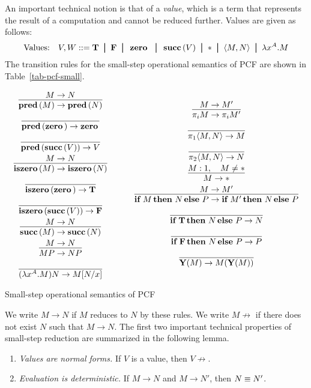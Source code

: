 \documentclass{article}
\begin{document}
An important technical notion is that of a {\em value}, which is a
term that represents the result of a computation and cannot be reduced
further. Values are given as follows:
\[ \mbox{Values:}\ssep V,W \bnf \truet \bor \falset \bor \zerot \bor
   \succt(V) \bor \unit \bor \pair{M,N} \bor \lamabs{x}{A}.M
\]
The transition rules for the small-step operational semantics of PCF
are shown in Table~\ref{tab-pcf-small}.
\begin{table*}[t]\def\nl{\\[1.8ex]}
\[
\begin{array}{c}
  \deriv{M\to N}{\predt(M)\to\predt(N)} \nl
  \deriv{}{\predt(\zerot)\to\zerot} \nl
  \deriv{}{\predt(\succt(V))\to V} \nl
  \deriv{M\to N}{\iszerot(M)\to\iszerot(N)} \nl
  \deriv{}{\iszerot(\zerot)\to\truet} \nl
  \deriv{}{\iszerot(\succt(V))\to\falset} \nl
  \deriv{M\to N}{\succt(M)\to\succt(N)} \nl
  \deriv{M\to N}{MP\to NP} \nl
  \deriv{}{(\lamabs{x}{A}.M)N\to \subst{M}{N}{x}}
\end{array}
\sep
\begin{array}{c}
  \deriv{M\to M'}{\proj{i} M\to \proj{i}M'} \nl
  \deriv{}{\proj1\pair{M,N}\to M} \nl
  \deriv{}{\proj2\pair{M,N}\to N} \nl
  \deriv{M:1,\ssep M\neq\unit}{M\to\unit} \nl
  \deriv{M\to M'}{\ite{M}{N}{P}\to\ite{M'}{N}{P}} \nl
  \deriv{}{\ite{\truet}{N}{P}\to N} \nl
  \deriv{}{\ite{\falset}{N}{P}\to P} \nl
  \deriv{}{\Y(M)\to M(\Y(M))} \nl
\end{array}
\]
\caption{Small-step operational semantics of PCF}
\label{tab-pcf-small}
\end{table*}

We write $M\to N$ if $M$ reduces to $N$ by these rules. We write
$M\not\to$ if there does not exist $N$ such that $M\to N$. The first
two important technical properties of small-step reduction are
summarized in the following lemma.

\begin{lemma}\label{lem-pcf-lemma1}
  \begin{enumerate}
  \item {\em Values are normal forms.} If $V$ is a value, then $V\not\to$.
  \item {\em Evaluation is deterministic.} If $M\to N$ and $M\to N'$,
    then $N\equiv N'$.
  \end{enumerate}
\end{lemma}
\end{document}
